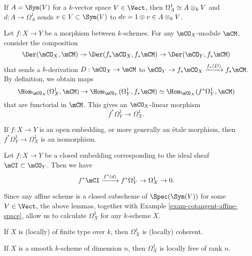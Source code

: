	\begin{exam}
		\label{exam-cotangent-affine-space}
		If $A=\Sym(V)$ for a $k$-vector space $V\in \Vect$, then $\Omega_{A}^1 \simeq A\ot_k V$ and $d: A\to \Omega_{A}^1$ sends $v\in V \subset \Sym(V)$ to $dv=1\ot v \in A\ot_k V $.
	\end{exam}
	
	\begin{constr}
		Let $f:X\to Y$ be a morphism between $k$-schemes. For any $\mCO_X$-module $\mCM$, consider the composition
		\[
			\Der(\mCO_X,\mCM) \to \Der( f_* \mCO_X, f_* \mCM ) \to \Der( \mCO_Y, f_* \mCM )
		\]
		that sends a $k$-derivation $D: \mCO_X \to \mCM$ to $\mCO_Y \to f_* \mCO_X \xrightarrow{f_*(D)} f_* \mCM$. By definition, we obtain maps
		\[
			\Hom_{\mCO_X}(\Omega_{X}^1, \mCM) \to \Hom_{\mCO_Y}(\Omega_{Y}^1, f_*\mCM) \simeq  \Hom_{\mCO_X}(f^*\Omega_{Y}^1, \mCM)
		\] 
		that are functorial in $\mCM$. This gives an $\mCO_X$-linear morphism
		\begin{equation}
			\label{eqn-functorial-cotangent}
			f^*\Omega_{Y}^1\to \Omega_{X}^1.
		\end{equation}
	\end{constr}

	\begin{lem}
		If $f: X\to Y$ is an open embedding, or more generally an étale morphism, then $f^*\Omega_{Y}^1\to \Omega_{X}^1$ is an isomorphism.
	\end{lem}

	\begin{lem}
		Let $f:X\to Y$ be a closed embedding corresponding to the ideal sheaf $\mCI \subset \mCO_Y$. Then we have 
		\[
			f^*\mCI \xrightarrow{f^*(d)} f^*\Omega_{Y}^1\to \Omega_{X}^1 \to 0.
		\]
	\end{lem}

	\begin{rem}
		Since any affine scheme is a closed subscheme of $\Spec(\Sym(V))$ for some $V\in \Vect$, the above lemmas, together with Example \ref{exam-cotangent-affine-space}, allow us to calculate $\Omega_{X}^1$ for any $k$-scheme $X$.
	\end{rem}

	\begin{cor}
		If $X$ is (locally) of finite type over $k$, then $\Omega^1_{X}$ is (locally) coherent.
	\end{cor}

	\begin{cor}
		If $X$ is a smooth $k$-scheme of dimension $n$, then $\Omega^1_{X}$ is locally free of rank $n$.
	\end{cor}

